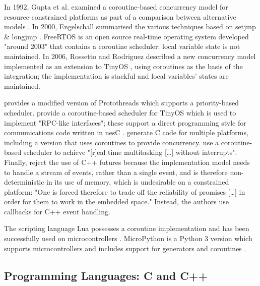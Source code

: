 In 1992, Gupta et al. examined a coroutine-based concurrency model for resource-constrained platforms as part of a comparison between alternative models \cite{Gupta1992}. In 2000, Engelschall summarised the various techniques based on setjmp \& longjmp \cite{Engelschall2000}. FreeRTOS \cite{Barry2018} is an open source real-time operating system developed "around 2003" that contains a coroutine scheduler: local variable state is not maintained. In 2006, Rossetto and Rodriguez described a new concurrency model \cite{Rossetto2006} implemented as an extension to TinyOS \cite{Levis2005}, using coroutines as the basis of the integration; the implementation is stackful and local variables' states are maintained. 


 provides a modified version of Protothreads which supports a priority-based scheduler.  provide a coroutine-based scheduler for TinyOS \cite{Levis2005} which is used to implement "RPC-like interfaces"; these support a direct programming style for communications code written in nesC \cite{Gay2003}.  generate C code for multiple platforms, including a version that uses coroutines to provide concurrency.  use a coroutine-based scheduler to achieve "[r]eal time multitasking […] without interrupts". Finally,  reject the use of C++ futures because the implementation model needs to handle a stream of events, rather than a single event, and is therefore non-deterministic in its use of memory, which is undesirable on a constrained platform: "One is forced therefore to trade off the reliability of promises […] in order for them to work in the embedded space." Instead, the authors use callbacks for C++ event handling.

The scripting language Lua possesses a coroutine implementation \cite{Moura2004a} and has been successfully used on microcontrollers \cite{Hempel2008}. MicroPython \cite{George2014a} is a Python 3 version which supports microcontrollers \cite{George2014b} and includes support for generators and coroutines \cite{VanRossum2005, Python2017}.

\subsection{Programming Languages: C and C++}

